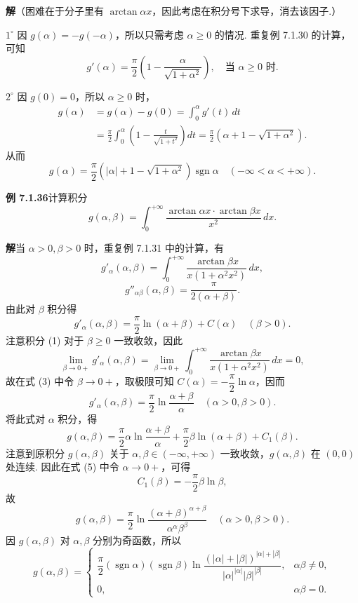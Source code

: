 \documentclass[UTF8, 12pt, fontset=fandol, oneside]{ctexart}
\begin{document}
\noindent\textbf{解}\quad （困难在于分子里有 $\arctan\alpha x$，因此考虑在积分号下求导，消去该因子.）

$1^\circ$ 因 $g(\alpha)=-g(-\alpha)$，所以只需考虑 $\alpha\ge0$ 的情况. 重复例 7.1.30 的计算，可知
\[
g'(\alpha)=\frac{\pi}{2}\left(1-\frac{\alpha}{\sqrt{1+\alpha^2}}\right),\quad \text{当 }\alpha\ge0\text{ 时}.
\]

$2^\circ$ 因 $g(0)=0$，所以 $\alpha\ge0$ 时，
\[
\begin{aligned}
g(\alpha)
&=g(\alpha)-g(0)=\int_0^\alpha g'(t)\,dt\\
&=\frac{\pi}{2}\int_0^\alpha\left(1-\frac{t}{\sqrt{1+t^2}}\right)dt
=\frac{\pi}{2}\left(\alpha+1-\sqrt{1+\alpha^2}\right).
\end{aligned}
\]
从而
\[
g(\alpha)=\frac{\pi}{2}\left(|\alpha|+1-\sqrt{1+\alpha^2}\right)\operatorname{sgn}\alpha
\quad(-\infty<\alpha<+\infty).
\]

\noindent\textbf{例 7.1.36}\quad 计算积分
\[
g(\alpha,\beta)=\int_0^{+\infty}\frac{\arctan\alpha x\cdot\arctan\beta x}{x^2}\,dx.
\]

\noindent\textbf{解}\quad 当 $\alpha>0,\beta>0$ 时，重复例 7.1.31 中的计算，有
\[
g'_\alpha(\alpha,\beta)
=\int_0^{+\infty}\frac{\arctan\beta x}{x(1+\alpha^2x^2)}\,dx,
\tag{1}
\]
\[
g''_{\alpha\beta}(\alpha,\beta)=\frac{\pi}{2(\alpha+\beta)}.
\tag{2}
\]
由此对 $\beta$ 积分得
\[
g'_\alpha(\alpha,\beta)=\frac{\pi}{2}\ln(\alpha+\beta)+C(\alpha)\quad(\beta>0).
\tag{3}
\]
注意积分 (1) 对于 $\beta\ge0$ 一致收敛，因此
\[
\lim_{\beta\to0+}g'_\alpha(\alpha,\beta)
=\lim_{\beta\to0+}\int_0^{+\infty}\frac{\arctan\beta x}{x(1+\alpha^2x^2)}\,dx=0,
\]
故在式 (3) 中令 $\beta\to0+$，取极限可知 $C(\alpha)=-\dfrac{\pi}{2}\ln\alpha$，因而
\[
g'_\alpha(\alpha,\beta)=\frac{\pi}{2}\ln\frac{\alpha+\beta}{\alpha}\quad(\alpha>0,\beta>0).
\tag{4}
\]
将此式对 $\alpha$ 积分，得
\[
g(\alpha,\beta)=\frac{\pi}{2}\alpha\ln\frac{\alpha+\beta}{\alpha}
+\frac{\pi}{2}\beta\ln(\alpha+\beta)+C_1(\beta).
\tag{5}
\]
注意到原积分 $g(\alpha,\beta)$ 关于 $\alpha,\beta\in(-\infty,+\infty)$ 一致收敛，$g(\alpha,\beta)$ 在 $(0,0)$ 处连续. 因此在式 (5) 中令 $\alpha\to0+$，可得
\[
C_1(\beta)=-\frac{\pi}{2}\beta\ln\beta,
\]
故
\[
g(\alpha,\beta)=\frac{\pi}{2}\ln\frac{(\alpha+\beta)^{\alpha+\beta}}{\alpha^\alpha\beta^\beta}
\quad(\alpha>0,\beta>0).
\tag{6}
\]
因 $g(\alpha,\beta)$ 对 $\alpha,\beta$ 分别为奇函数，所以
\[
g(\alpha,\beta)=
\begin{cases}
\dfrac{\pi}{2}(\operatorname{sgn}\alpha)(\operatorname{sgn}\beta)
\ln\dfrac{(|\alpha|+|\beta|)^{|\alpha|+|\beta|}}{|\alpha|^{|\alpha|}|\beta|^{|\beta|}}, & \alpha\beta\ne0,\\[0.8em]
0, & \alpha\beta=0.
\end{cases}
\]
\end{document}
